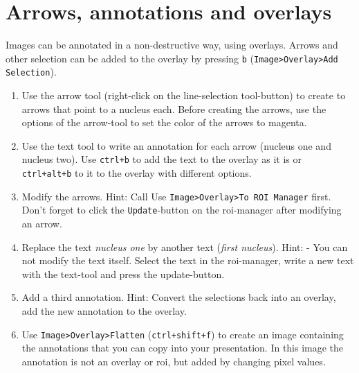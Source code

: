 \section{Arrows, annotations and overlays}

Images can be annotated in a non-destructive way, using overlays. Arrows and other selection can
be added to the overlay by pressing \texttt{b} (\texttt{Image>Overlay>Add Selection}).

\begin{enumerate}
\item Use the arrow tool (right-click on the line-selection tool-button) to create to arrows that
point to a nucleus each. Before creating the arrows, use the options of the arrow-tool to set
the color of the arrows to magenta.

\item Use the text tool to write an annotation for each arrow (nucleus one and nucleus two). Use
\texttt{ctrl+b} to add the text to the overlay as it is or \texttt{ctrl+alt+b} to it to the overlay with different options.

\item Modify the arrows. Hint: Call Use \texttt{Image>Overlay>To ROI Manager} first. Don't forget to click the \texttt{Update}-button on the roi-manager after modifying an arrow.

\item Replace the text \textit{nucleus one} by another text (\textit{first nucleus}). Hint: - You can not modify the text itself. Select the text in the roi-manager, write a new text with the text-tool and press the update-button.

\item Add a third annotation. Hint: Convert the selections back into an overlay, add the new
annotation to the overlay.

\item Use \texttt{Image>Overlay>Flatten} (\texttt{ctrl+shift+f}) to create an image containing the annotations that you can copy into your presentation. In this image the annotation is not an overlay or roi, but added by changing pixel values.

\end{enumerate}